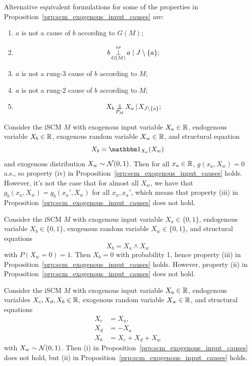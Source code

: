 \begin{Rem}\label{rem:scm_exogenous_input_causes_alt}
  Alternative equivalent formulations for some of the properties in Proposition~\ref{prp:scm_exogenous_input_causes} are:
  \begin{enumerate}
    \item[(i')] $a$ is not a cause of $b$ according to $G(M)$;
    \item[(i'')] $$b \operatorname*{\perp}^{i\sigma}_{G(M)} a \mid J \setminus \{a\};$$
    \item[(iv')] $a$ is not a rung-3 cause of $b$ according to $M$;
    \item[(v')] $a$ is not a rung-2 cause of $b$ according to $M$;
    \item[(v'')] $$X_b \operatorname*{\perp\mkern-11mu\perp}_{P_{M}} X_a \operatorname*{|} X_{J\setminus\{a\}};$$
  \end{enumerate}
\end{Rem}

\begin{Eg}\label{eg:scm_cause_of_iv_notimplies_iii}
  Consider the iSCM $M$ with exogenous input variable $X_a \in \mathbb{R}$, endogenous variable $X_b \in \mathbb{R}$, exogenous random variable $X_w \in \mathbb{R}$, and structural equation
  $$X_b = \ind_{X_a}(X_w)$$
  and exogenous distribution $X_w \sim \mathcal{N}(0,1)$.
  Then for all $x_a \in \mathbb{R}$, $g(x_a,X_w) = 0$ a.s., so property (iv) in Proposition~\ref{prp:scm_exogenous_input_causes} holds.
  However, it's not the case that for almost all $X_w$, we have that $g_b(x_a,X_w) = g_b(x_a',X_w)$ for all $x_a,x_a'$, which means that property (iii) in Proposition~\ref{prp:scm_exogenous_input_causes} does not hold.
\end{Eg}

\begin{Eg}\label{eg:scm_cause_of_iii_notimplies_ii}
  Consider the iSCM $M$ with exogenous input variable $X_a \in \{0,1\}$, endogenous variable $X_b \in \{0,1\}$, exogenous random variable $X_w \in \{0,1\}$, and structural equations
  $$X_b = X_a \wedge X_w$$
  with $P(X_w=0) = 1$.
  Then $X_b = 0$ with probability 1, hence property (iii) in Proposition~\ref{prp:scm_exogenous_input_causes} holds.
  However, property (ii) in Proposition~\ref{prp:scm_exogenous_input_causes} does not hold.
\end{Eg}

\begin{Eg}\label{eg:scm_cause_of_ii_notimplies_i}
  Consider the iSCM $M$ with exogenous input variable $X_a \in \mathbb{R}$, endogenous variables $X_c, X_d, X_b \in \mathbb{R}$, exogenous random variable $X_w \in \mathbb{R}$, and structural equations
  \begin{align*}
    X_c &= X_a, \\
    X_d &= -X_a \\
    X_b &= X_c + X_d + X_w 
  \end{align*}
  with $X_w \sim \mathcal{N}(0,1)$.
  Then (i) in Proposition~\ref{prp:scm_exogenous_input_causes} does not hold, but (ii) in Proposition~\ref{prp:scm_exogenous_input_causes} holds.
\end{Eg}

